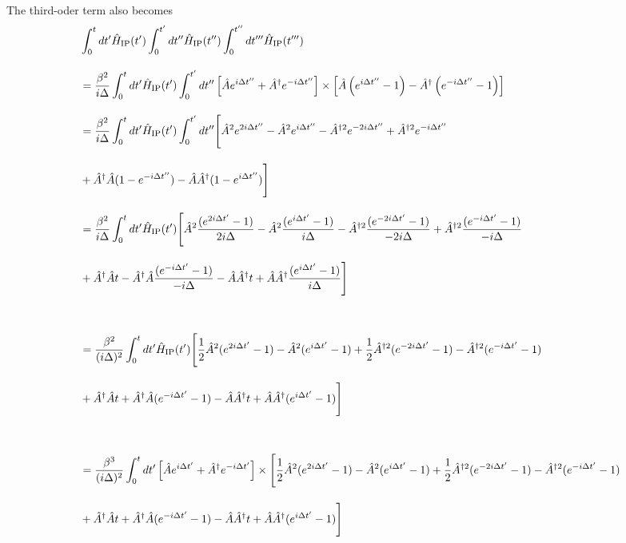 The third-oder term also becomes
\begin{align}
    &\int_0^{t}dt^\prime \hat{H}_{\rm{IP}}(t^\prime)
    \int_0^{t^\prime}dt^{\prime\prime} \hat{H}_{\rm{IP}}(t^{\prime\prime})
    \int_0^{t^{\prime\prime}}dt^{\prime\prime\prime}
    \hat{H}_{\rm{IP}}(t^{\prime\prime\prime})\nn[10pt]
    &=\frac{\beta^2}{i\Delta}\int_0^{t}dt^\prime
    \hat{H}_{\rm{IP}}(t^{\prime})
    \int_0^{t^\prime}dt^{\prime\prime}
    \left[
    \hat{A}e^{i\Delta t^{\prime\prime}}
    +\hat{A}^\dagger e^{-i\Delta t^{\prime\prime}}
    \right]
    \times
    \left[
    \hat{A}
    \left(e^{i\Delta t^{\prime\prime}}-1\right)
    -\hat{A}^\dagger\left(e^{-i\Delta t^{\prime\prime}}-1\right)
    \right]\nn[10pt]
    &=\frac{\beta^2}{i\Delta}\int_0^{t}dt^\prime
    \hat{H}_{\rm{IP}}(t^{\prime})
    \int_0^{t^\prime}dt^{\prime\prime}
    \Biggl[
    \hat{A}^2e^{2i\Delta t^{\prime\prime}}
    -\hat{A}^2e^{i\Delta t^{\prime\prime}}
    -\hat{A}^{\dagger2}e^{-2i\Delta t^{\prime\prime}}
    +\hat{A}^{\dagger2}e^{-i\Delta t^{\prime\prime}}\nn[10pt]
    &
    +\hat{A}^{\dagger}\hat{A}(1-e^{-i\Delta t^{\prime\prime}})
    -\hat{A}\hat{A}^{\dagger}(1-e^{i\Delta t^{\prime\prime}})
    \Biggr]\nn[10pt]
    &=\frac{\beta^2}{i\Delta}\int_0^{t}dt^\prime
    \hat{H}_{\rm{IP}}(t^{\prime})
    \Biggl[
    \hat{A}^2\frac{(e^{2i\Delta t^\prime}-1)}{2i\Delta}
    -\hat{A}^2\frac{(e^{i\Delta t^\prime}-1)}{i\Delta}
    -\hat{A}^{\dagger2}\frac{(e^{-2i\Delta t^\prime}-1)}{-2i\Delta}
    +\hat{A}^{\dagger2}\frac{(e^{-i\Delta t^\prime}-1)}{-i\Delta}\nn[10pt]
    &
    +\hat{A}^{\dagger}\hat{A}t
    -\hat{A}^{\dagger}\hat{A}\frac{(e^{-i\Delta t^\prime}-1)}{-i\Delta}
    -\hat{A}\hat{A}^{\dagger}t
    +\hat{A}\hat{A}^{\dagger}\frac{(e^{i\Delta t^\prime}-1)}{i\Delta}
    \Biggr]\nn[30pt]
    &=\frac{\beta^2}{(i\Delta)^2}\int_0^{t}dt^\prime
    \hat{H}_{\rm{IP}}(t^{\prime})
    \Biggl[
    \frac{1}{2}\hat{A}^2(e^{2i\Delta t^\prime}-1)
    -\hat{A}^2(e^{i\Delta t^\prime}-1)
    +\frac{1}{2}\hat{A}^{\dagger2}(e^{-2i\Delta t^\prime}-1)
    -\hat{A}^{\dagger2}(e^{-i\Delta t^\prime}-1)\nn[10pt]
    &
    +\hat{A}^{\dagger}\hat{A}t
    +\hat{A}^{\dagger}\hat{A}(e^{-i\Delta t^\prime}-1)
    -\hat{A}\hat{A}^{\dagger}t
    +\hat{A}\hat{A}^{\dagger}(e^{i\Delta t^\prime}-1)
    \Biggr]\nn[30pt]
    &=\frac{\beta^3}{(i\Delta)^2}\int_0^{t}dt^\prime
    \left[
    \hat{A}e^{i\Delta t^{\prime}}
    +\hat{A}^\dagger e^{-i\Delta t^{\prime}}
    \right]
    \times
    \Biggl[
    \frac{1}{2}\hat{A}^2(e^{2i\Delta t^\prime}-1)
    -\hat{A}^2(e^{i\Delta t^\prime}-1)
    +\frac{1}{2}\hat{A}^{\dagger2}(e^{-2i\Delta t^\prime}-1)
    -\hat{A}^{\dagger2}(e^{-i\Delta t^\prime}-1)\nn[10pt]
    &
    +\hat{A}^{\dagger}\hat{A}t
    +\hat{A}^{\dagger}\hat{A}(e^{-i\Delta t^\prime}-1)
    -\hat{A}\hat{A}^{\dagger}t
    +\hat{A}\hat{A}^{\dagger}(e^{i\Delta t^\prime}-1)
    \Biggr]
\end{align}



